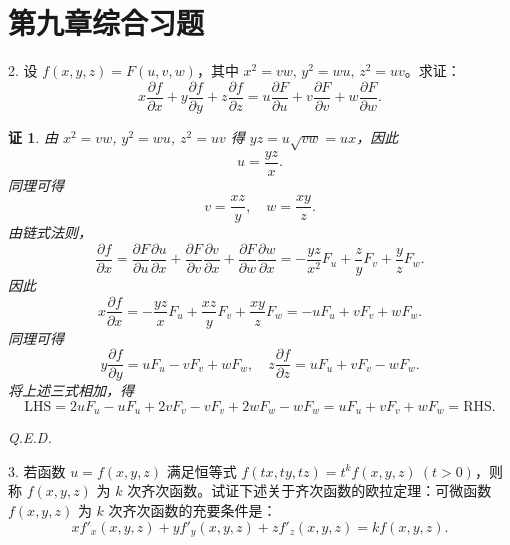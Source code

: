 \documentclass[a4paper,12pt]{article}
\newtheorem*{pf}{证}
\begin{document}
\section*{第九章综合习题}

2. 设 $f(x,y,z) = F(u,v,w)$，其中 $x^2 = vw,\,y^2 = wu,\,z^2 = uv$。求证：
$$
    x\frac{\partial f}{\partial x} + y\frac{\partial f}{\partial y} + z\frac{\partial f}{\partial z} = u\frac{\partial F}{\partial u} + v\frac{\partial F}{\partial v} + w\frac{\partial F}{\partial w}.
$$

\begin{pf}
    由 $x^2 = vw$, $y^2 = wu$, $z^2 = uv$ 得 $yz = u\sqrt{vw} = ux$，因此
    $$
        u = \frac{yz}{x}.
    $$
    同理可得
    $$
        v = \frac{xz}{y}, \quad w = \frac{xy}{z}.
    $$
    由链式法则，
    $$
        \frac{\partial f}{\partial x} = \frac{\partial F}{\partial u}\frac{\partial u}{\partial x} + \frac{\partial F}{\partial v}\frac{\partial v}{\partial x} + \frac{\partial F}{\partial w}\frac{\partial w}{\partial x} = -\frac{yz}{x^2}F_u + \frac{z}{y}F_v + \frac{y}{z}F_w.
    $$
    因此
    $$
        x\frac{\partial f}{\partial x} = -\frac{yz}{x}F_u + \frac{xz}{y}F_v + \frac{xy}{z}F_w = -uF_u + vF_v + wF_w.
    $$
    同理可得
    $$
        y\frac{\partial f}{\partial y} = uF_u - vF_v + wF_w, \quad z\frac{\partial f}{\partial z} = uF_u + vF_v - wF_w.
    $$
    将上述三式相加，得
    $$
        \text{LHS} = 2uF_u - uF_u + 2vF_v - vF_v + 2wF_w - wF_w = uF_u + vF_v + wF_w = \text{RHS}.
    $$

    Q.E.D.
\end{pf}

3. 若函数 $u = f(x,y,z)$ 满足恒等式 $f(tx,ty,tz) = t^k f(x,y,z)\ (t>0)$，则称 $f(x,y,z)$ 为 $k$ 次齐次函数。试证下述关于齐次函数的欧拉定理：可微函数 $f(x,y,z)$ 为 $k$ 次齐次函数的充要条件是：
$$
    x f'_x(x,y,z) + y f'_y(x,y,z) + z f'_z(x,y,z) = k f(x,y,z).
$$
\end{document}
